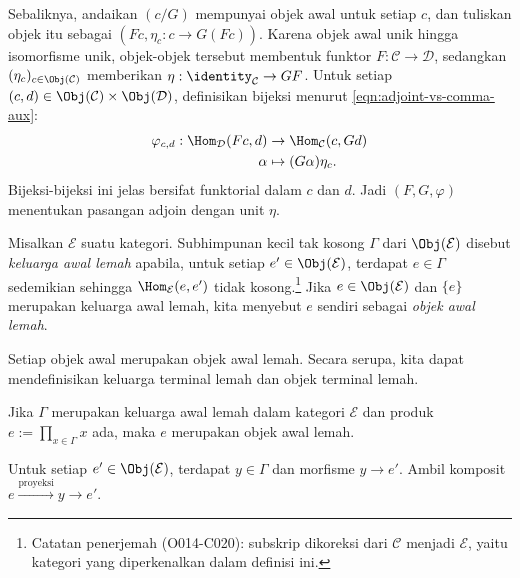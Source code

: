 \begin{bukti}
	Sebaliknya, andaikan $(c/G)$ mempunyai objek awal untuk setiap $c$, dan
	tuliskan objek itu sebagai $(Fc,\eta_c:c\to G(Fc))$. Karena objek awal
	unik hingga isomorfisme unik, objek-objek tersebut membentuk funktor
	$F:\mathcal{C}\to\mathcal{D}$, sedangkan
	$(\eta_c)_{c\in\Obj(\mathcal{C})}$ memberikan
	$\eta:\identity_{\mathcal{C}}\to GF$. Untuk setiap
	$(c,d)\in\Obj(\mathcal{C})\times\Obj(\mathcal{D})$, definisikan bijeksi
	menurut \eqref{eqn:adjoint-vs-comma-aux}:
	\begin{align*}
		\varphi_{c, d}: \Hom_{\mathcal{D}}(Fc, d) & \to \Hom_{\mathcal{C}}(c, Gd) \\
		\alpha & \mapsto (G\alpha) \eta_c.
	\end{align*}
	Bijeksi-bijeksi ini jelas bersifat funktorial dalam $c$ dan $d$. Jadi
	$(F,G,\varphi)$ menentukan pasangan adjoin dengan unit $\eta$.
\end{bukti}

\begin{definisi}
	Misalkan $\mathcal{E}$ suatu kategori. Subhimpunan kecil tak kosong
	$\Gamma$ dari $\Obj(\mathcal{E})$ disebut \emph{keluarga awal lemah}
	apabila, untuk setiap $e'\in\Obj(\mathcal{E})$, terdapat $e\in\Gamma$
	sedemikian sehingga
	$\Hom_{\mathcal{E}}(e,e')$ tidak kosong.\footnote{Catatan penerjemah
	(O014-C020): subskrip dikoreksi dari $\mathcal{C}$ menjadi
	$\mathcal{E}$, yaitu kategori yang diperkenalkan dalam definisi ini.}
	Jika $e\in\Obj(\mathcal{E})$ dan $\{e\}$ merupakan keluarga awal lemah,
	kita menyebut $e$ sendiri sebagai \emph{objek awal lemah}.
\end{definisi}

Setiap objek awal merupakan objek awal lemah. Secara serupa, kita dapat
mendefinisikan keluarga terminal lemah dan objek terminal lemah.

\begin{lema}\label{prop:weakly-initial-prod}
	Jika $\Gamma$ merupakan keluarga awal lemah dalam kategori $\mathcal{E}$
	dan produk $e:=\prod_{x\in\Gamma}x$ ada, maka $e$ merupakan objek awal
	lemah.
\end{lema}
\begin{bukti}
	Untuk setiap $e'\in\Obj(\mathcal{E})$, terdapat $y\in\Gamma$ dan
	morfisme $y\to e'$. Ambil komposit
	$e\xrightarrow{\text{proyeksi}}y\to e'$.
\end{bukti}


